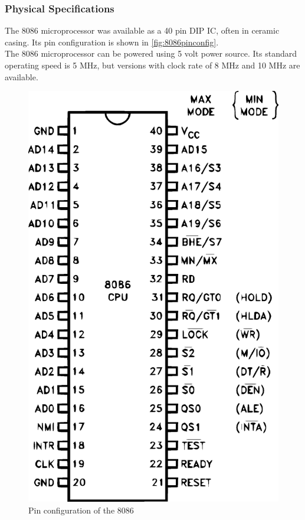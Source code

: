 \subsubsection{Physical Specifications}
The 8086 microprocessor was available as a 40 pin DIP IC, often in ceramic casing. Its pin configuration is shown in \autoref{fig:8086pinconfig}.\\
The 8086 microprocessor can be powered using 5 volt power source. Its standard operating speed is 5 MHz, but versions with clock rate of 8 MHz and 10 MHz are available.\\ 
\begin{figure}[h]
\centering
\includegraphics[scale=0.25]{figures/8086pinconfig.eps}
\caption{Pin configuration of the 8086 \cite{intel19908086}}
\label{fig:8086pinconfig}
\end{figure}
